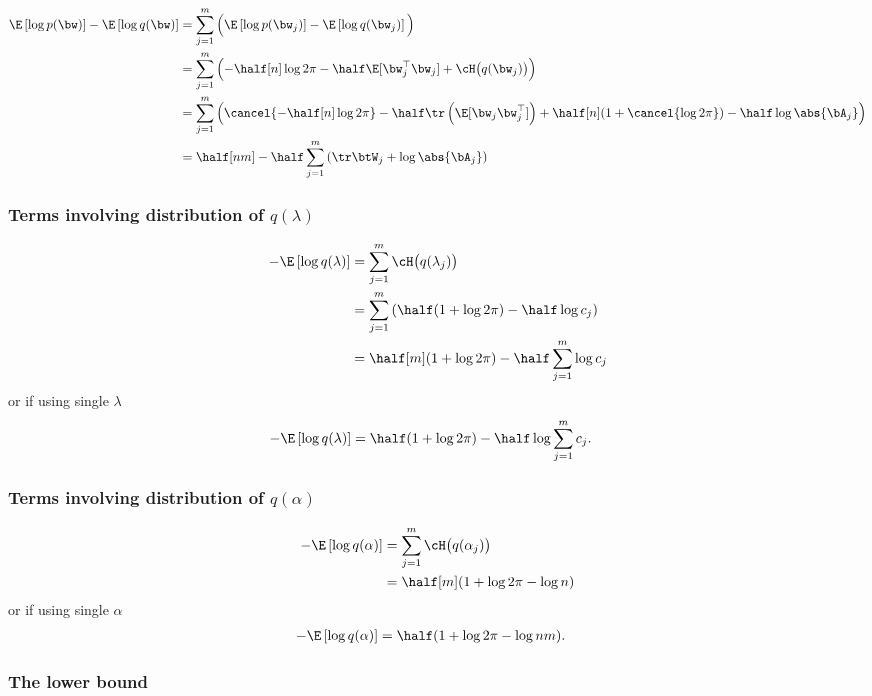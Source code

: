 \begin{align*}
  \E\left[ \log p(\bw) \right] - \E\left[ \log q(\bw) \right]
  &= \sum_{j=1}^m \Big( \E\left[ \log p(\bw_j) \right] - \E\left[ \log q(\bw_j) \right] \Big)  \\
  &= \sum_{j=1}^m \left( -\half[n] \log 2\pi - \half \E[\bw_j^\top\bw_j] + \cH\big(q(\bw_j)\big) \right) \\
  &= \sum_{j=1}^m \left( \cancel{-\half[n] \log 2\pi} - \half\tr\left( \E[\bw_j\bw_j^\top]\right) + \half[n] (1 + \cancel{\log 2\pi}) - \half \log \abs{\bA_j} \right) \\
  &= \half[nm] - \half \sum_{j=1}^m \left( \tr \btW_j + \log \abs{\bA_j} \right)
\end{align*}

\subsubsection{Terms involving distribution of $q(\lambda)$}

\begin{align*}
  -\E\left[ \log q(\lambda) \right] 
  &= \sum_{j=1}^m \cH\big(q(\lambda_j)\big)  \\
  &= \sum_{j=1}^m \left( \half (1 + \log 2\pi) - \half \log c_j \right) \\
  &= \half[m](1 + \log 2\pi) - \half \sum_{j=1}^m \log c_j
\end{align*}
or if using single $\lambda$
\begin{align*}
  -\E\left[ \log q(\lambda) \right] 
  &= \half(1 + \log 2\pi) - \half  \log  \sum_{j=1}^m c_j .
\end{align*}

\subsubsection{Terms involving distribution of $q(\alpha)$}

\begin{align*}
  -\E\left[ \log q(\alpha) \right] 
  &= \sum_{j=1}^m \cH\big(q(\alpha_j)\big) \\
  &= \half[m] (1 + \log 2\pi - \log n)
\end{align*}
or if using single $\alpha$
\begin{align*}
  -\E\left[ \log q(\alpha) \right] 
  &= \half (1 + \log 2\pi - \log nm).
\end{align*}

\subsubsection{The lower bound}

